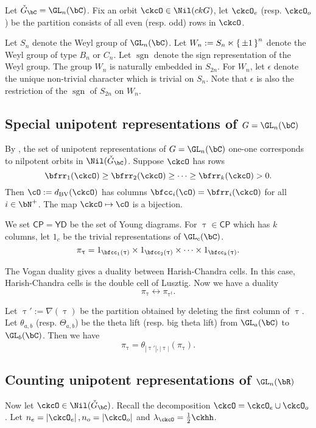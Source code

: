 \documentclass[12pt,a4paper]{amsart}
\def\abs#1{\left|{#1}\right|}
\newcommand{\CP}{{\mathcal {P}}}
\newcommand{\sgn}{\operatorname{sgn}}
\def\DD{\nabla}
\numberwithin{equation}{section}
\theoremstyle{remark}
\def\half{{\tfrac{1}{2}}}
\def\ckGc{\check{G}_{\bC}}
\def\dBV{d_{\mathrm{BV}}}
\def\CP{\mathsf{CP}}
\def\YD{\mathsf{YD}}
\def\DD{\nabla}
\begin{document}
Let $\ckGc = \GL_n(\bC)$. 
Fix
an orbit $\ckcO\in \Nil(ckG)$, let $\ckcO_e$ (resp. $\ckcO_o$) be the partition
consists of all even (resp. odd) rows in $\ckcO$.

Let $S_n$ denote the Weyl group of $\GL_n(\bC)$.
Let $W_n := S_n \ltimes \set{\pm 1}^n$ denote the Weyl group of type $B_n$ or $C_n$.  
Let $\sgn$ denote the sign representation of the Weyl group. 
The group $W_n$ is naturally embedded in $S_{2n}$.
For $W_n$, let $\epsilon$ denote the unique non-trivial character which is trivial on $S_n$. 
Note that $\epsilon$ is also the restriction of the $\sgn$ of $S_{2n}$ on $W_n$. 


\subsection{Special unipotent representations of $G = \GL_n(\bC)$}
By \cite{BVUni}, the set of unipotent representations
of $G = \GL_n(\bC)$ one-one corresponds to nilpotent orbits in $\Nil(\ckGc)$. 
Suppose $\ckcO$ has rows 
\[
\bfrr_1(\ckcO)\geq \bfrr_2(\ckcO)\geq \cdots\geq 
\bfrr_k(\ckcO) >0. 
\]
Then $\cO := \dBV(\ckcO)$ has columns $\bfcc_i(\cO) = \bfrr_i(\ckcO)$ for all 
$i\in \bN^+$. 
The map $\ckcO \mapsto \cO$ is a bijection.


We set $\CP =  \YD$ be the set of Young diagrams. 
For $\uptau \in \CP$ which has $k$ columns,
let $1_{c}$ be the trivial representations of $\GL_c(\bC)$. 
\[
 \pi_\uptau = 1_{\bfcc_1(\uptau)}\times  1_{\bfcc_2(\uptau)}\times \cdots 
 \times 1_{\bfcc_k(\uptau)}.
\]

The Vogan duality gives a duality between Harish-Chandra cells. 
In this case, Harish-Chandra cells is the double cell  
of Lusztig.  
Now we have a duality 
\[
 \pi_\uptau \leftrightarrow \pi_{\uptau^t}. 
\]

Let $\uptau' := \DD(\uptau)$ be the partition obtained by deleting the first column 
of $\uptau$. 
Let $\theta_{a,b}$ (resp. $\Theta_{a,b}$) be the  theta lift (resp. big theta lift) from $\GL_a(\bC)$ to  
$\GL_b(\bC)$. 
Then we have 
\[
  \pi_{\uptau} = \theta_{{\abs{\uptau'}},{\abs{\uptau}}} (\pi_{\uptau}). 
\]

\subsection{Counting unipotent representations of $\GL_n(\bR)$}
Now let $\ckcO\in \Nil(\ckGc)$. 
Recall the decomposition $\ckcO  = \ckcO_e \cup \ckcO_o$.
Let $n_e = \abs{\ckcO_e}, n_o = \abs{\ckcO_o}$ and $\lambda_\ckcO = \half \ckhh$. 
\end{document}
